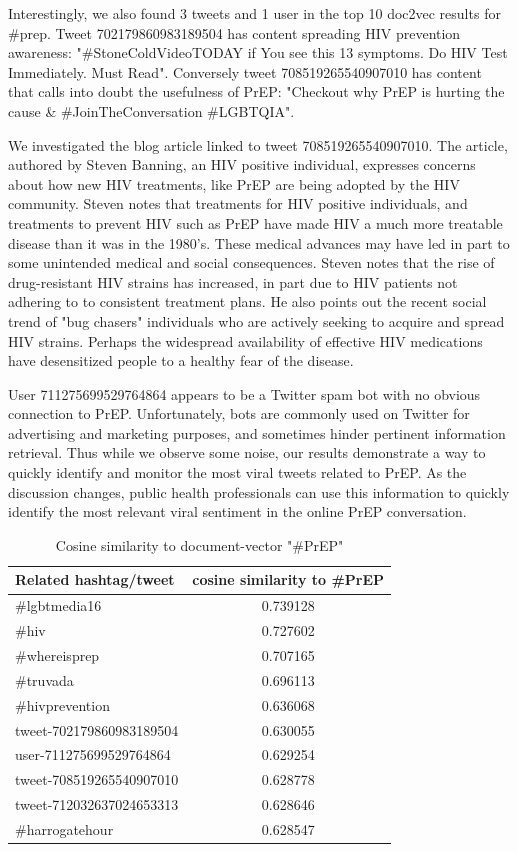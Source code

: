 \documentclass{sig-alternate-05-2015}
\begin{document}
Interestingly, we also found 3 tweets and 1 user in the top 10 doc2vec results for \#prep. Tweet 702179860983189504 has content spreading HIV prevention awareness: "\#StoneColdVideoTODAY if You see this 13 symptoms. Do HIV Test Immediately. Must Read". Conversely tweet 708519265540907010 has content that calls into doubt the usefulness of PrEP: "Checkout why PrEP is hurting the cause \& \#JoinTheConversation \#LGBTQIA".

We investigated the blog article linked to tweet 708519265540907010\cite{prephurtingcause}. The article, authored by Steven Banning, an HIV positive individual, expresses concerns about how new HIV treatments, like PrEP are being adopted by the HIV community. Steven notes that treatments for HIV positive individuals, and treatments to prevent HIV such as PrEP have made HIV a much more treatable disease than it was in the 1980's. These medical advances may have led in part to some unintended medical and social consequences. Steven notes that the rise of drug-resistant HIV strains has increased, in part due to HIV patients not adhering to to consistent treatment plans. He also points out the recent social trend of "bug chasers" individuals who are actively seeking to acquire and spread HIV strains. Perhaps the widespread availability of effective HIV medications have desensitized people to a healthy fear of the disease.

User 711275699529764864 appears to be a Twitter spam bot with no obvious connection to PrEP. Unfortunately, bots are commonly used on Twitter for advertising and marketing purposes, and sometimes hinder pertinent information retrieval. Thus while we observe some noise, our results demonstrate a way to quickly identify and monitor the most viral tweets related to PrEP. As the discussion changes, public health professionals can use this information to quickly identify the most relevant viral sentiment in the online PrEP conversation.

\begin{table}
\centering
\caption{Cosine similarity to document-vector "\#PrEP"}
\begin{tabular}{|l|c|} \hline
Related hashtag/tweet & cosine similarity to \#PrEP\\ \hline
\#lgbtmedia16 & 0.739128\\ \hline
\#hiv & 	0.727602 \\ \hline
\#whereisprep & 0.707165 \\ \hline
\#truvada & 0.696113 \\ \hline
\#hivprevention & 0.636068 \\ \hline
tweet-702179860983189504 & 0.630055\\ \hline
user-711275699529764864 & 0.629254\\ \hline
tweet-708519265540907010 & 0.628778 \\ \hline
tweet-712032637024653313 & 0.628646 \\ \hline
\#harrogatehour & 0.628547 \\ \hline
\hline\end{tabular}
\end{table}
\end{document}
